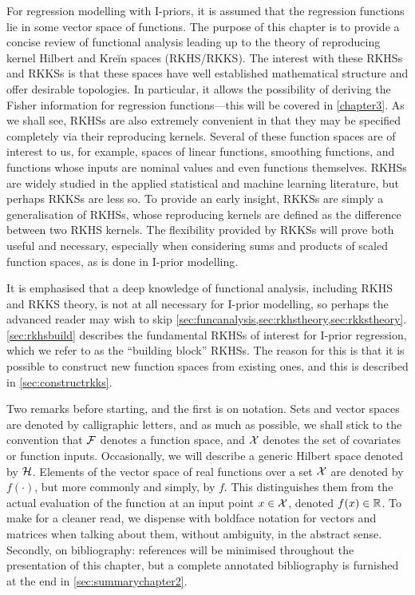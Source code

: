 \documentclass[showframe,11pt,twoside,openright]{report}
\begin{document}
\label{chapter2}
\thispagestyle{chaptertwo}

For regression modelling with I-priors, it is assumed that the regression functions lie in some vector space of functions.
The purpose of this chapter is to provide a concise review of functional analysis leading up to the theory of reproducing kernel Hilbert and Kreĭn spaces (RKHS/RKKS).
The interest with these RKHSs and RKKSs is that these spaces have well established mathematical structure and offer desirable topologies.
In particular, it allows the possibility of deriving the Fisher information for regression functions---this will be covered in \cref{chapter3}.
As we shall see, RKHSs are also extremely convenient in that they may be specified completely via their reproducing kernels.
Several of these function spaces are of interest to us, for example, spaces of linear functions, smoothing functions, and functions whose inputs are nominal values and even functions themselves.
RKHSs are widely studied in the applied statistical and machine learning literature, but perhaps RKKSs are less so.
To provide an early insight, RKKSs are simply a generalisation of RKHSs, whose reproducing kernels are defined as the difference between two RKHS kernels.
The flexibility provided by RKKSs will prove both useful and necessary, especially when considering sums and products of scaled function spaces, as is done in I-prior modelling.

It is emphasised that a deep knowledge of functional analysis, including RKHS and RKKS theory, is not at all necessary for I-prior modelling, so perhaps the advanced reader may wish to skip \cref{sec:funcanalysis,sec:rkhstheory,sec:rkkstheory}. 
\cref{sec:rkhsbuild} describes the fundamental RKHSs of interest for I-prior regression, which we refer to as the ``building block'' RKHSs.
The reason for this is that it is possible to construct new function spaces from existing ones, and this is described in \cref{sec:constructrkks}.

Two remarks before starting, and the first is on notation.
Sets and vector spaces are denoted by calligraphic letters, and as much as possible, we shall stick to the convention that ${\mathcal F}$ denotes a function space, and ${\mathcal X}$ denotes the set of covariates or function inputs. 
Occasionally, we will describe a generic Hilbert space denoted by ${\mathcal H}$.
Elements of the vector space of real functions over a set ${\mathcal X}$ are denoted by $f(\cdot)$, but more commonly and simply, by $f$.
This distinguishes them from the actual evaluation of the function at an input point $x \in {\mathcal X}$, denoted $f(x) \in \mathbb{R}$.
To make for a cleaner read, we dispense with boldface notation for vectors and matrices when talking about them, without ambiguity, in the abstract sense.
Secondly, on bibliography: references will be minimised throughout the presentation of this chapter, but a complete annotated bibliography is furnished at the end in \cref{sec:summarychapter2}.
 
\end{document}
